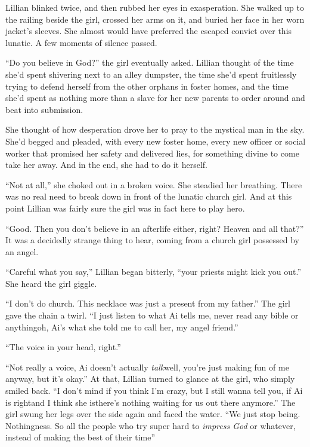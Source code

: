 \begin{Standard}
Lillian blinked twice, and then rubbed her eyes in exasperation. She walked up to
the railing beside the girl, crossed her arms on it, and buried her face in her
worn jacket's sleeves. She almost would have preferred the escaped convict over this
lunatic. A few moments of silence passed.

``Do you believe in God?'' the girl eventually asked. Lillian thought of the time
she'd spent shivering next to an alley dumpster, the time she'd spent fruitlessly
trying to defend herself from the other orphans in foster homes, and the time she'd
spent as nothing more than a slave for her new parents to order around and beat
into submission.

She thought of how desperation drove her to pray to the mystical man in the sky.
She'd begged and pleaded, with every new foster home, every new officer or social
worker that promised her safety and delivered lies, for something divine to come
take her away. And in the end, she had to do it herself.

``Not at all,'' she choked out in a broken voice. She steadied her breathing.
There was no real need to break down in front of the lunatic church girl. And
at this point Lillian was fairly sure the girl was in fact here to play hero.

``Good. Then you don't believe in an afterlife either, right? Heaven and all that?''
It was a decidedly strange thing to hear, coming from a church girl possessed by
an angel.

``Careful what you say,'' Lillian began bitterly, ``your priests might kick you out.''
She heard the girl giggle.

``I don't do church. This necklace was just a present from my father.'' The girl gave
the chain a twirl. ``I just listen to what Ai tells me, never read any bible or anything\textemdash{}oh,
Ai's what she told me to call her, my angel friend.''

``The voice in your head, right.''

``Not really a voice, Ai doesn't actually \emph{talk}\textemdash{}well, you're just
making fun of me anyway, but it's okay.'' At that, Lillian turned to glance at the girl,
who simply smiled back. ``I don't mind if you think I'm crazy, but I still wanna tell you,
if Ai is right\textemdash{}and I think she is\textemdash{}there's nothing waiting for us
out there anymore.'' The girl swung her legs over the side again and faced the water. ``We just
stop being. Nothingness. So all the people who try super hard to \emph{impress God} or whatever,
instead of making the best of their time\textemdash{}''


\end{Standard}
